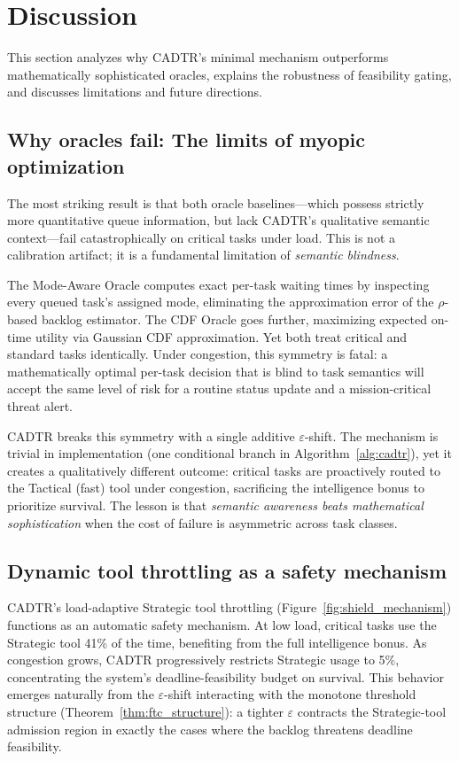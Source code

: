 \documentclass[preprint,12pt]{elsarticle}
\begin{document}
\section{Discussion}
\label{sec:discussion}

This section analyzes why CADTR's minimal mechanism outperforms mathematically sophisticated oracles, explains the robustness of feasibility gating, and discusses limitations and future directions.

\subsection{Why oracles fail: The limits of myopic optimization}

The most striking result is that both oracle baselines---which possess strictly more quantitative queue information, but lack CADTR's qualitative semantic context---fail catastrophically on critical tasks under load. This is not a calibration artifact; it is a fundamental limitation of \emph{semantic blindness}.

The Mode-Aware Oracle computes exact per-task waiting times by inspecting every queued task's assigned mode, eliminating the approximation error of the $\rho$-based backlog estimator. The CDF Oracle goes further, maximizing expected on-time utility via Gaussian CDF approximation. Yet both treat critical and standard tasks identically. Under congestion, this symmetry is fatal: a mathematically optimal per-task decision that is blind to task semantics will accept the same level of risk for a routine status update and a mission-critical threat alert.

CADTR breaks this symmetry with a single additive $\varepsilon$-shift. The mechanism is trivial in implementation (one conditional branch in Algorithm~\ref{alg:cadtr}), yet it creates a qualitatively different outcome: critical tasks are proactively routed to the Tactical (fast) tool under congestion, sacrificing the intelligence bonus to prioritize survival. The lesson is that \emph{semantic awareness beats mathematical sophistication} when the cost of failure is asymmetric across task classes.

\subsection{Dynamic tool throttling as a safety mechanism}

CADTR's load-adaptive Strategic tool throttling (Figure~\ref{fig:shield_mechanism}) functions as an automatic safety mechanism. At low load, critical tasks use the Strategic tool 41\% of the time, benefiting from the full intelligence bonus. As congestion grows, CADTR progressively restricts Strategic usage to 5\%, concentrating the system's deadline-feasibility budget on survival. This behavior emerges naturally from the $\varepsilon$-shift interacting with the monotone threshold structure (Theorem~\ref{thm:ftc_structure}): a tighter $\varepsilon$ contracts the Strategic-tool admission region in exactly the cases where the backlog threatens deadline feasibility.
\end{document}
